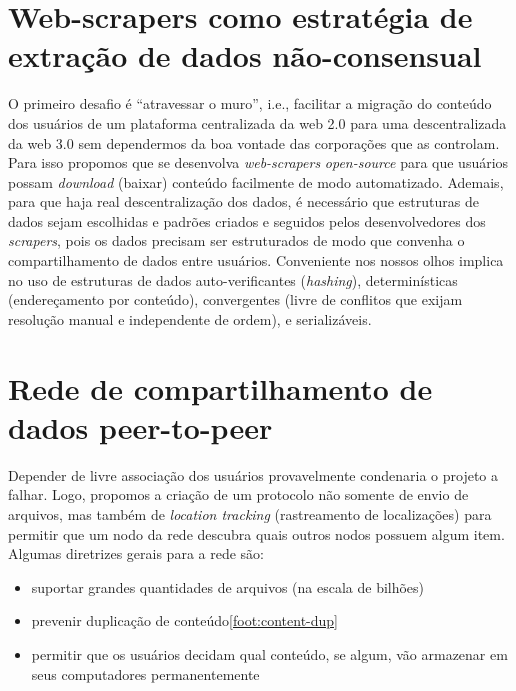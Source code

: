 \section{Web-scrapers como estratégia de extração de dados não-consensual}

O primeiro desafio é ``atravessar o muro'', i.e., facilitar a migração do conteúdo dos usuários de um plataforma centralizada da web 2.0 para uma descentralizada da web 3.0 sem dependermos da boa vontade das corporações que as controlam.
Para isso propomos que se desenvolva \textit{web-scrapers} \textit{open-source} para que usuários possam \textit{download} (baixar) conteúdo facilmente de modo automatizado.
Ademais, para que haja real descentralização dos dados, é necessário que estruturas de dados sejam escolhidas e padrões criados e seguidos pelos desenvolvedores dos \textit{scrapers}, pois os dados precisam ser estruturados de modo que convenha o compartilhamento de dados entre usuários.
Conveniente nos nossos olhos implica no uso de estruturas de dados auto-verificantes (\textit{hashing}), determinísticas (endereçamento por conteúdo), convergentes (livre de conflitos que exijam resolução manual e independente de ordem), e serializáveis.

\section{Rede de compartilhamento de dados peer-to-peer}

Depender de livre associação dos usuários provavelmente condenaria o projeto a falhar.
Logo, propomos a criação de um protocolo não somente de envio de arquivos, mas também de \textit{location tracking} (rastreamento de localizações) para permitir que um nodo da rede descubra quais outros nodos possuem algum item.
Algumas diretrizes gerais para a rede são:
\begin{itemize}
    \item suportar grandes quantidades de arquivos (na escala de bilhões)
    \item prevenir duplicação de conteúdo\ref{foot:content-dup}
    \item permitir que os usuários decidam qual conteúdo, se algum, vão armazenar em seus computadores permanentemente
\end{itemize}

